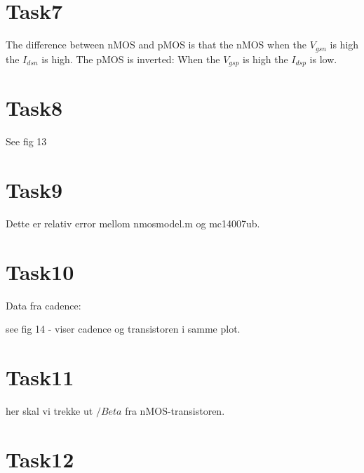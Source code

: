 \documentclass[11pt,a4paper]{report}
\begin{document}
\section{Task7}
The difference between nMOS and pMOS is that the nMOS when the $V_{gsn}$ is high the $I_{dsn}$ is high. The pMOS is inverted: When the  $V_{gsp}$ is high the $I_{dsp}$ is low.

\section{Task8}
See fig 13

\section{Task9}


Dette er relativ error mellom nmosmodel.m og mc14007ub.

\section{Task10}

Data fra cadence:

see fig 14 - viser cadence og transistoren i samme plot.
\section{Task11}
her skal vi trekke ut $/Beta$ fra nMOS-transistoren. 

\section{Task12}
\end{document}
